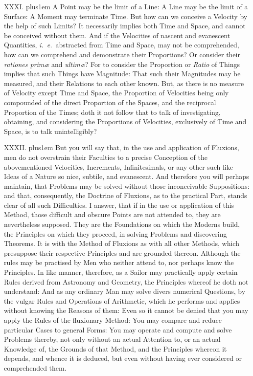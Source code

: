 \medbreak

XXXI. \hskip 0pt plus1em
A Point may be the limit of a Line: A Line may be the limit of a
Surface: A Moment may terminate Time.  But how can we conceive a
Velocity by the help of such Limits?  It necessarily implies both
Time and Space, and cannot be conceived without them.  And if the
Velocities of nascent and evanescent Quantities,
{\it i.~e.}\ abstracted from Time and Space, may not be
comprehended, how can we comprehend and demonstrate their
Proportions? Or consider their {\it rationes prim{\ae}\/} and
{\it ultim{\ae}\/}?  For to consider the Proportion or
{\it Ratio\/} of Things implies that such Things have Magnitude:
That such their Magnitudes may be measured, and their Relations
to each other known.  But, as there is no measure of Velocity
except Time and Space, the Proportion of Velocities being only
compounded of the direct Proportion of the Spaces, and the
reciprocal Proportion of the Times; doth it not follow that to
talk of investigating, obtaining, and considering the Proportions
of Velocities, exclusively of Time and Space, is to talk
unintelligibly?

\medbreak

XXXII. \hskip 0pt plus1em
But you will say that, in the use and application of Fluxions,
men do not overstrain their Faculties to a precise Conception of
the abovementioned Velocities, Increments, Infinitesimals, or any
other such like Ideas of a Nature so nice, subtile, and
evanescent.  And therefore you will perhaps maintain, that
Problems may be solved without those inconceivable Suppositions:
and that, consequently, the Doctrine of Fluxions, as to the
practical Part, stands clear of all such Difficulties.  I answer,
that if in the use or application of this Method, those difficult
and obscure Points are not attended to, they are nevertheless
supposed.  They are the Foundations on which the Moderns build,
the Principles on which they proceed, in solving Problems and
discovering Theorems.  It is with the Method of Fluxions as with
all other Methods, which presuppose their respective Principles
and are grounded thereon.  Although the rules may be practised by
Men who neither attend to, nor perhaps know the Principles.  In
like manner, therefore, as a Sailor may practically apply certain
Rules derived from Astronomy and Geometry, the Principles whereof
he doth not understand: And as any ordinary Man may solve divers
numerical Questions, by the vulgar Rules and Operations of
Arithmetic, which he performs and applies without knowing the
Reasons of them: Even so it cannot be denied that you may apply
the Rules of the fluxionary Method: You may compare and reduce
particular Cases to general Forms: You may operate and compute
and solve Problems thereby, not only without an actual Attention
to, or an actual Knowledge of, the Grounds of that Method, and
the Principles whereon it depends, and whence it is deduced, but
even without having ever considered or comprehended them.

